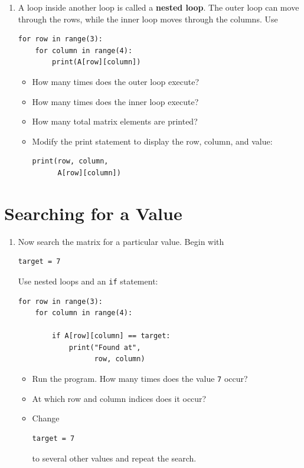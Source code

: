 \documentclass{article}
\begin{document}
\begin{enumerate}

\item A loop inside another loop is called a \textbf{nested loop}.  The outer loop can move through the rows, while the inner loop moves through the columns. Use

\begin{verbatim}
for row in range(3):
    for column in range(4):
        print(A[row][column])
\end{verbatim}

\begin{itemize}

\item How many times does the outer loop execute?
\item How many times does the inner loop execute?
\item How many total matrix elements are printed?
\item Modify the print statement to display the row, column, and value:

\begin{verbatim}
print(row, column,
      A[row][column])
\end{verbatim}

\end{itemize}

\end{enumerate}


\section{Searching for a Value}

\begin{enumerate}

\item Now search the matrix for a particular value. Begin with

\begin{verbatim}
target = 7
\end{verbatim}

Use nested loops and an \texttt{if} statement:

\begin{verbatim}
for row in range(3):
    for column in range(4):

        if A[row][column] == target:
            print("Found at",
                  row, column)
\end{verbatim}

\begin{itemize}

\item Run the program.  How many times does the value \texttt{7} occur?
\item At which row and column indices does it occur?
\item Change

\begin{verbatim}
target = 7
\end{verbatim}

to several other values and repeat the search.

\end{itemize}

\end{enumerate}
\end{document}
